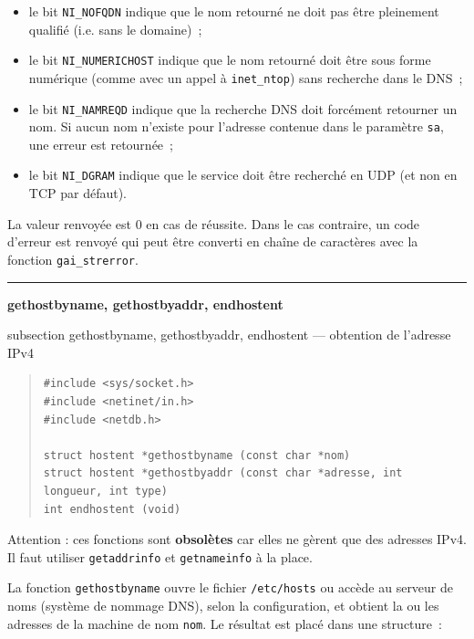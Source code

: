 \documentclass [twoside] {report}
\newcommand {\primitive} [1]
    {
	\phantomsection
	{\large \textbf {#1}}
	\addcontentsline {toc} {subsection} {#1}
    }
\newcommand {\separation}
    {
	\vspace {5mm}
	\nopagebreak
	\hrule
    }
\begin{document}
\begin {itemize}
    \item le bit \texttt {NI\_NOFQDN} indique que le nom retourné
	ne doit pas être pleinement qualifié (i.e. sans le domaine)~;

    \item le bit \texttt {NI\_NUMERICHOST} indique que le nom
	retourné doit être sous forme numérique (comme avec un appel
	à \texttt {inet\_ntop}) sans recherche dans le DNS~;

    \item le bit \texttt {NI\_NAMREQD} indique que la recherche
	DNS doit forcément retourner un nom. Si aucun nom n'existe
	pour l'adresse contenue dans le paramètre \texttt {sa}, une
	erreur est retournée~;

    \item le bit \texttt {NI\_DGRAM} indique que le service doit
	être recherché en UDP (et non en TCP par défaut).

\end {itemize}

La valeur renvoyée est 0 en cas de réussite. Dans le cas contraire,
un code d'erreur est renvoyé qui peut être converti en chaîne de
caractères avec la fonction \texttt {gai\_strerror}.


\separation
\primitive {gethostbyname, gethostbyaddr,
endhostent} --- obtention de l'adresse IPv4

\begin {quote}
\begin {verbatim}
#include <sys/socket.h>
#include <netinet/in.h>
#include <netdb.h>

struct hostent *gethostbyname (const char *nom)
struct hostent *gethostbyaddr (const char *adresse, int longueur, int type)
int endhostent (void)
\end{verbatim}
\end {quote}

Attention : ces fonctions sont \textbf {obsolètes} car elles ne gèrent que
des adresses IPv4. Il faut utiliser \texttt {getaddrinfo} et \texttt
{getnameinfo} à la place.

La fonction \texttt {gethostbyname} ouvre le fichier \texttt {/etc/hosts}
ou accède au serveur de noms (système de nommage DNS), selon la
configuration, et obtient la ou les adresses de la machine de nom
\texttt {nom}. Le résultat est placé dans une structure~:
\end{document}
